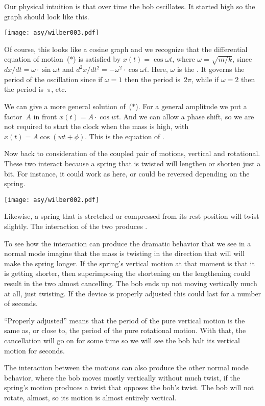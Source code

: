 Our physical intuition is that over time the bob oscillates.
It started high so 
the graph should look like this.
\begin{center}
  \texttt{[image: asy/wilber003.pdf]}
\end{center}
Of course, this looks like a cosine graph and we recognize 
that the differential equation of motion~($*$) is satisfied by
$x(t)=\cos \omega t$, where $\omega=\sqrt{m/k}$,
since $dx/dt=\omega\cdot \sin \omega t$
and $d^2x/dt^2=-\omega^2\cdot \cos \omega t$.
Here, $\omega$ is the .
It governs the period of the oscillation since if $\omega=1$ then the
period is~$2\pi$, while if $\omega=2$ then the period is~$\pi$, etc.

We can give a more general solution of~($*$).
For a general amplitude we put a factor~$A$ in front
$x(t)=A\cdot \cos wt$.
And we can allow a phase shift, 
so we are not required to start the clock when the
mass is high, with 
$x(t)=A\cos (wt+\phi)$.
This is the equation of .

Now back to consideration of the coupled pair of motions, 
vertical and rotational.
These two interact because a spring that is twisted will 
lengthen or shorten just a bit.
For instance, it could work as here, or could be reversed depending on the
spring.  
\begin{center}
  \texttt{[image: asy/wilber002.pdf]}
\end{center}
Likewise, a spring that is stretched or compressed from its rest
position will twist slightly.
The interaction of the two produces .

To see how the interaction can produce the dramatic behavior that
we see in a normal mode
imagine that the mass is twisting in the direction that will 
will make the spring longer.
If the spring's vertical motion at that moment is that it is getting shorter, 
then  
superimposing the shortening on the lengthening
could result in the two almost cancelling.
The bob ends up not moving vertically much at all, just twisting.
If the device is properly adjusted this could last for a number of seconds.

``Properly adjusted'' means that  
the period of the pure vertical motion is the same as, 
or close to, the period of the pure rotational motion.
With that, the cancellation will go on for some time so 
we will see the bob halt its vertical motion for seconds. 

The interaction between the motions can also produce the other normal mode 
behavior, where the bob moves mostly vertically without much twist,
if the spring's motion produces a twist that opposes the bob's twist.
The bob will not rotate, almost, so its motion is almost entirely vertical.

